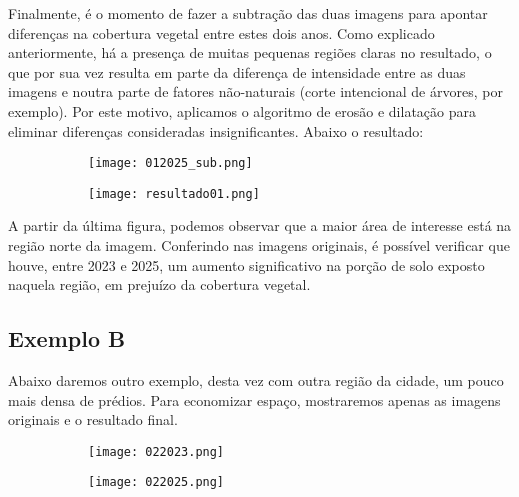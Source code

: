 \documentclass{article}
\begin{document}
Finalmente, é o momento de fazer a subtração das duas imagens para apontar diferenças na cobertura vegetal entre estes dois anos. Como explicado anteriormente, há a presença de muitas pequenas regiões claras no resultado, o que por sua vez resulta em parte da diferença de intensidade entre as duas imagens e noutra parte de fatores não-naturais (corte intencional de árvores, por exemplo). Por este motivo, aplicamos o algoritmo de erosão e dilatação para eliminar diferenças consideradas insignificantes. Abaixo o resultado:

\begin{figure}[H]
    \centering
    \begin{subfigure}[b]{0.48\textwidth}
        \texttt{[image: 012025\_sub.png]}
        \label{2023}
    \end{subfigure}
    \hfill %
    \begin{subfigure}[b]{0.48\textwidth}
        \texttt{[image: resultado01.png]}
        \label{2025}
    \end{subfigure}
    \label{resultado}
\end{figure}

A partir da última figura, podemos observar que a maior área de interesse está na região norte da imagem. Conferindo nas imagens originais, é possível verificar que houve, entre 2023 e 2025, um aumento significativo na porção de solo exposto naquela região, em prejuízo da cobertura vegetal.

\subsection{Exemplo B}

Abaixo daremos outro exemplo, desta vez com outra região da cidade, um pouco mais densa de prédios. Para economizar espaço, mostraremos apenas as imagens originais e o resultado final.

\begin{figure}[H]
    \centering
    \begin{subfigure}[b]{0.48\textwidth}
        \texttt{[image: 022023.png]}
        \label{2023}
    \end{subfigure}
    \hfill %
    \begin{subfigure}[b]{0.48\textwidth}
        \texttt{[image: 022025.png]}
        \label{2025}
    \end{subfigure}
    \label{original}
\end{figure}
\end{document}
